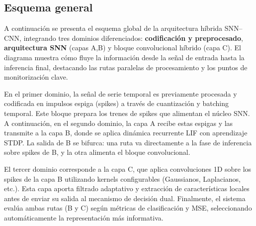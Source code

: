 



    
\subsection{Esquema general}

A continuación se presenta el esquema global de la arquitectura híbrida SNN–CNN, integrando tres dominios diferenciados: \textbf{codificación y preprocesado}, \textbf{arquitectura SNN} (capas A,B) y bloque convolucional híbrido (capa C). El diagrama muestra cómo fluye la información desde la señal de entrada hasta la inferencia final, destacando las rutas paralelas de procesamiento y los puntos de monitorización clave.

En el primer dominio, la señal de serie temporal es previamente procesada y codificada en impulsos espiga (spikes) a través de cuantización y batching temporal. Este bloque prepara los trenes de spikes que alimentan el núcleo SNN. A continuación, en el segundo dominio, la capa A recibe estas espigas y las transmite a la capa B, donde se aplica dinámica recurrente LIF con aprendizaje STDP. La salida de B se bifurca: una ruta va directamente a la fase de inferencia sobre spikes de B, y la otra alimenta el bloque convolucional.

El tercer dominio corresponde a la capa C, que aplica convoluciones 1D sobre los spikes de la capa B utilizando kernels configurables (Gaussianos, Laplacianos, etc.). Esta capa aporta filtrado adaptativo y extracción de características locales antes de enviar su salida al mecanismo de decisión dual. Finalmente, el sistema evalúa ambas rutas (B y C) según métricas de clasificación y MSE, seleccionando automáticamente la representación más informativa.

